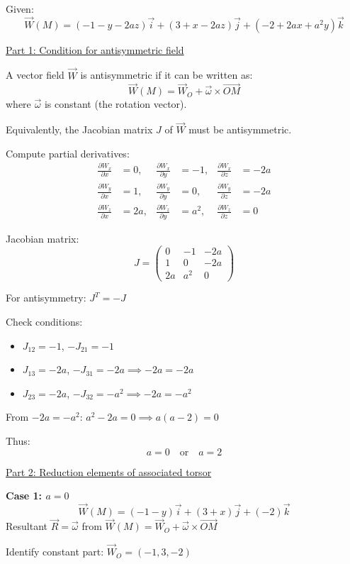 \documentclass[12pt]{article}
\begin{document}
\begin{correctionbox}
Given:
\[
\vec{W}(M) = (-1 - y - 2az)\vec{i} + (3 + x - 2az)\vec{j} + (-2 + 2ax + a^2y)\vec{k}
\]

\underline{Part 1: Condition for antisymmetric field}

A vector field $\vec{W}$ is antisymmetric if it can be written as:
\[
\vec{W}(M) = \vec{W}_O + \vec{\omega} \times \vec{OM}
\]
where $\vec{\omega}$ is constant (the rotation vector).

Equivalently, the Jacobian matrix $J$ of $\vec{W}$ must be antisymmetric.

Compute partial derivatives:
\begin{align*}
\frac{\partial W_x}{\partial x} &= 0, & \frac{\partial W_x}{\partial y} &= -1, & \frac{\partial W_x}{\partial z} &= -2a \\
\frac{\partial W_y}{\partial x} &= 1, & \frac{\partial W_y}{\partial y} &= 0, & \frac{\partial W_y}{\partial z} &= -2a \\
\frac{\partial W_z}{\partial x} &= 2a, & \frac{\partial W_z}{\partial y} &= a^2, & \frac{\partial W_z}{\partial z} &= 0
\end{align*}

Jacobian matrix:
\[
J = \begin{pmatrix}
0 & -1 & -2a \\
1 & 0 & -2a \\
2a & a^2 & 0
\end{pmatrix}
\]

For antisymmetry: $J^T = -J$

Check conditions:
\begin{itemize}
\item $J_{12} = -1$, $-J_{21} = -1$ 
\item $J_{13} = -2a$, $-J_{31} = -2a \implies -2a = -2a$ 
\item $J_{23} = -2a$, $-J_{32} = -a^2 \implies -2a = -a^2$
\end{itemize}

From $-2a = -a^2$: $a^2 - 2a = 0 \implies a(a - 2) = 0$

Thus:
\[
\boxed{a = 0 \quad \text{or} \quad a = 2}
\]

\underline{Part 2: Reduction elements of associated torsor}

\textbf{Case 1: $a = 0$}
\[
\vec{W}(M) = (-1 - y)\vec{i} + (3 + x)\vec{j} + (-2)\vec{k}
\]
Resultant $\vec{R} = \vec{\omega}$ from $\vec{W}(M) = \vec{W}_O + \vec{\omega} \times \vec{OM}$

Identify constant part: $\vec{W}_O = (-1, 3, -2)$


\end{correctionbox}
\end{document}
